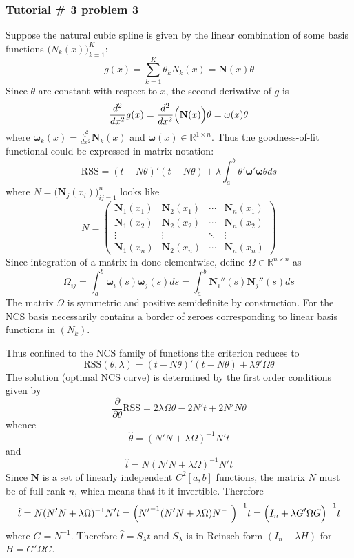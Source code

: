 \documentclass[a4paper]{article}
\newcommand{\Real}{\mathbb{R}}
\newcommand{\RSS}{\text{RSS}}
\begin{document}

\subsubsection{Tutorial \# 3 problem 3} %
\label{ssub:tutorial_3_problem_3}

Suppose the natural cubic spline is given by the linear combination of some basis
functions $\bigl(N_k(x)\bigr)_{k=1}^K$:
\[
g(x)
= \sum_{k = 1}^K \theta_k N_k(x)
= \mathbf{N}(x) \theta
\]
Since $\theta$ are constant with respect to $x$, the second derivative of $g$ is
\[
\frac{d^2}{dx^2} g(x)
= \frac{d^2}{dx^2} \Bigl(\mathbf{N}(x)\Bigr) \theta
= \mathbf{\omega}(x) \theta
\]
where $\mathbf{\omega}_k(x) = \frac{d^2}{dx^2}\mathbf{N}_k(x)$ and
$\mathbf{\omega}(x) \in \Real^{1\times n}$. Thus the goodness-of-fit functional
could be expressed in matrix notation:
\[
\RSS
= (t-N\theta)' (t-N\theta)
+ \lambda \int_a^b \theta' \mathbf{\omega}'\mathbf{\omega} \theta ds
\]
where $N = \bigl(\mathbf{N}_j(x_i)\bigr)_{ij=1}^n$ looks like
\[N = \begin{pmatrix}
	\mathbf{N}_1(x_1) & \mathbf{N}_2(x_1) & \cdots & \mathbf{N}_n(x_1)\\
	\mathbf{N}_1(x_2) & \mathbf{N}_2(x_2) & \cdots & \mathbf{N}_n(x_2)\\
	\vdots & \vdots & \ddots & \vdots\\
	\mathbf{N}_1(x_n) & \mathbf{N}_2(x_n) & \cdots & \mathbf{N}_n(x_n)
\end{pmatrix}\]
Since integration of a matrix in done elementwise, define $\Omega\in \Real^{n\times n}$ as
\[
\Omega_{ij}
= \int_a^b \mathbf{\omega}_i(s) \mathbf{\omega}_j(s) ds
= \int_a^b \mathbf{N}_i''(s) \mathbf{N}_j''(s) ds
\]
The matrix $\Omega$ is symmetric and positive semidefinite by construction. For
the NCS basis necessarily contains a border of zeroes corresponding to linear
basis functions in $(N_k)$.

Thus confined to the NCS family of functions the criterion reduces to
\[ \RSS(\theta, \lambda) = (t-N\theta)' (t-N\theta) + \lambda \theta'\Omega\theta \]
The solution (optimal NCS curve) is determined by the first order conditions given
by
\[ \frac{\partial}{\partial \theta} \RSS = 2\lambda \Omega\theta - 2 N't + 2 N'N \theta \]
whence
\[\hat{\theta} = (N'N + \lambda \Omega)^{-1} N' t\]
and 
\[\hat{t} = N (N'N + \lambda \Omega)^{-1} N' t\]
Since $\mathbf{N}$ is a set of linearly independent $C^2[a,b]$ functions, the matrix
$N$ must be of full rank $n$, which means that it it invertible. Therefore
\[
\hat{t}
= N (N'N + \lambda \Omega)^{-1} N' t
= \Bigl( {N'}^{-1} ( N'N + \lambda \Omega) N^{-1} \Bigr)^{-1} t 
= \Bigl( I_n + \lambda G'\Omega G \Bigr)^{-1} t
\]
where $G = N^{-1}$. Therefore $\hat{t} = S_\lambda t$ and $S_\lambda$ is in Reinsch
form $(I_n + \lambda H)$ for $H = G'\Omega G$.
\end{document}
